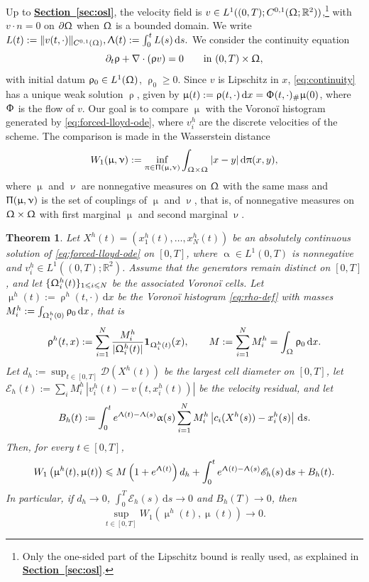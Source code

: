 \documentclass[letterpaper,11pt,twoside]{article}
\numberwithin{figure}{section}
\numberwithin{table}{section}
\theoremstyle{cpamplain}
\newtheorem{theorem}{Theorem}[section]
\theoremstyle{cpamdefinition}
\newcommand{\R}{\mathbb{R}}
\newcommand{\diff}{\mathrm{d}}
\newcommand{\Secref}[1]{\textbf{\hyperref[#1]{Section~\ref*{#1}}}}
\let\alpha\upalpha
\let\mu\upmu
\let\nu\upnu
\let\pi\uppi
\let\rho\uprho
\let\Lambda\Uplambda
\let\Pi\Uppi
\let\Phi\Upphi
\let\Omega\Upomega
\renewcommand{\le}{\leqslant}
\renewcommand{\ge}{\geqslant}
\numberwithin{equation}{section}
\begin{document}
Up to \Secref{sec:osl}, the velocity field is $v\in L^1((0,T);C^{0,1}(\Omega;\R^2))$,\footnote{Only the one-sided part of the Lipschitz bound is really used, as explained in \Secref{sec:osl}.} with $v\cdot n=0$ on $\partial\Omega$ when $\Omega$ is a bounded domain. We write
\(
L(t):=\|v(t,\cdot)\|_{C^{0,1}(\Omega)},
\Lambda(t):=\int_0^t L(s)\,\diff s.
\)
We consider the continuity equation
\begin{equation}\label{eq:continuity}
\partial_t\rho+\nabla\cdot(\rho v)=0\qquad\text{in }(0,T)\times\Omega,
\end{equation}
with initial datum $\rho_0\in L^1(\Omega)$, $\rho_0\ge0$.
Since $v$ is Lipschitz in $x$, \eqref{eq:continuity} has a unique weak solution $\rho$, given by $\mu(t):=\rho(t,\cdot)\,\diff x=\Phi(t,\cdot)_\#\mu(0)$, where $\Phi$ is the flow of $v$.
Our goal is to compare $\mu$ with the Vorono\"i histogram generated by \eqref{eq:forced-lloyd-ode}, where $v_i^h$ are the discrete velocities of the scheme.
The comparison is made in the Wasserstein distance \cite{villani}
\[
W_1(\mu,\nu):=\inf_{\pi\in\Pi(\mu,\nu)}\int_{\Omega\times\Omega}|x-y|\,\diff\pi(x,y),
\]
where $\mu$ and $\nu$ are nonnegative measures on $\Omega$ with the same mass and $\Pi(\mu,\nu)$ is the set of couplings of $\mu$ and $\nu$, that is, of nonnegative measures on $\Omega\times\Omega$ with first marginal $\mu$ and second marginal $\nu$.

\begin{theorem}\label{thm:W1-convergence}
Let $X^h(t)=(x_1^h(t),\dots,x_N^h(t))$ be an absolutely continuous solution of \eqref{eq:forced-lloyd-ode} on $[0,T]$, where $\alpha\in L^1(0,T)$ is nonnegative and $v_i^h\in L^1((0,T);\R^2)$.
Assume that the generators remain distinct on $[0,T]$, and let $\{\Omega_i^h(t)\}_{1\le i\le N}$ be the associated Vorono\"i cells.
Let $\mu^h(t):=\rho^h(t,\cdot)\,\diff x$ be the Vorono\"i histogram \eqref{eq:rho-def} with masses $M_i^h:=\int_{\Omega_i^h(0)}\rho_0\,\diff x$, that is
\[
\rho^h(t,x):=\sum_{i=1}^N\frac{M_i^h}{|\Omega_i^h(t)|}\mathbf 1_{\Omega_i^h(t)}(x),
\qquad
M:=\sum_{i=1}^N M_i^h=\int_\Omega \rho_0\,\diff x .
\]
Let $d_h:=\sup_{t\in[0,T]}\mathscr D(X^h(t))$ be the largest cell diameter on $[0,T]$, let $\mathscr E_h(t):=\sum_i M_i^h\,|v_i^h(t)-v(t,x_i^h(t))|$ be the velocity residual, and let
\begin{equation}\label{eq:lloyd_defect_weighted}
B_h(t):=\int_0^t e^{\Lambda(t)-\Lambda(s)}\alpha(s)
\sum_{i=1}^N M_i^h\left|c_i(X^h(s))-x_i^h(s)\right|\,\diff s.
\end{equation}
Then, for every $t\in[0,T]$,
\begin{equation}\label{eq:W1_conv_bound}
W_1\left(\mu^h(t),\mu(t)\right)
\le M\left(1+e^{\Lambda(t)}\right)d_h
+\int_0^t e^{\Lambda(t)-\Lambda(s)}\mathscr E_h(s)\,\diff s
+B_h(t).
\end{equation}
In particular, if
$
d_h\to0$,
$\int_0^T\mathscr E_h(s)\,\diff s\to 0 $ and 
$B_h(T)\to0$, 
then 
$$\sup_{t\in[0,T]}W_1(\mu^h(t),\mu(t))\to 0.$$
\end{theorem}
\end{document}
